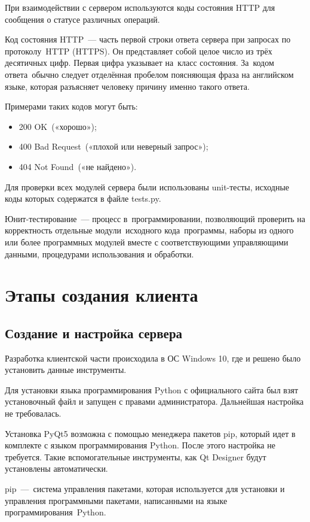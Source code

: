 \documentclass[14pt, a4paper]{extarticle}
\begin{document}
    При взаимодействии с сервером используются коды состояния HTTP для сообщения о статусе различных операций.

    Код состояния HTTP — часть первой строки ответа сервера при запросах по протоколу HTTP (HTTPS). Он представляет собой целое число из трёх десятичных цифр. Первая цифра указывает на класс состояния. За кодом ответа обычно следует отделённая пробелом поясняющая фраза на английском языке, которая разъясняет человеку причину именно такого ответа.

    Примерами таких кодов могут быть:
    \begin{itemize}
        \item 200 OK («хорошо»);
        \item 400 Bad Request («плохой или неверный запрос»);
        \item 404 Not Found («не найдено»).
    \end{itemize}

    Для проверки всех модулей сервера были использованы unit-тесты, исходные коды которых содержатся в файле tests.py.

    Юнит-тестирование — процесс в программировании, позволяющий проверить на корректность отдельные модули исходного кода программы, наборы из одного или более программных модулей вместе с соответствующими управляющими данными, процедурами использования и обработки. 


    \clearpage
    \section{Этапы создания клиента}
    \subsection{Создание и настройка сервера}
    Разработка клиентской части происходила в ОС Windows 10, где и решено было установить данные инструменты.

    Для установки языка программирования Python с официального сайта был взят установочный файл и запущен с правами администратора. Дальнейшая настройка не требовалась.

    Установка PyQt5 возможна с помощью менеджера пакетов pip, который идет в комплекте с языком программирования Python. После этого настройка не требуется. Такие вспомогательные инструменты, как Qt Designer будут установлены автоматически.

    pip — система управления пакетами, которая используется для установки и управления программными пакетами, написанными на языке программирования Python.
\end{document}
